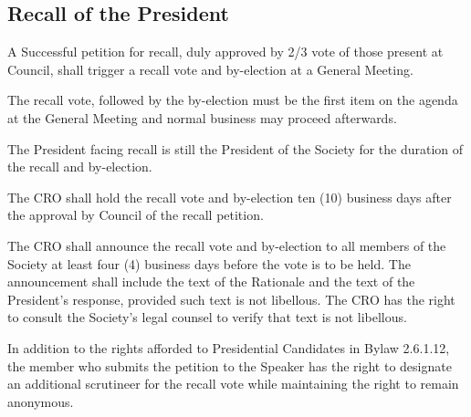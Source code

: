 \subsection{Recall of the President}
\begin{longenum}[ label*=\thesubsection.\arabic*., align=left]
	\item A Successful petition for recall, duly approved by 2/3 vote of those present at Council, shall trigger a recall vote and by-election at a General Meeting.
    \begin{longenum}[ label*=\arabic*., align=left]
		\item The recall vote, followed by the by-election must be the first item on the agenda at the General Meeting and normal business may proceed afterwards.
	\end{longenum}
	
    \item The President facing recall is still the President of the Society for the duration of the recall and by-election.
    \item The CRO shall hold the recall vote and by-election ten (10) business days after the approval by Council of the recall petition.
    \item The CRO shall announce the recall vote and by-election to all members of the Society at least four (4) business days before the vote is to be held. The announcement shall include the text of the Rationale and the text of the President's response, provided such text is not libellous. The CRO has the right to consult the Society's legal counsel to verify that text is not libellous.
    \item In addition to the rights afforded to Presidential Candidates in Bylaw 2.6.1.12, the member who submits the petition to the Speaker has the right to designate an additional scrutineer for the recall vote while maintaining the right to remain anonymous.
\end{longenum}

